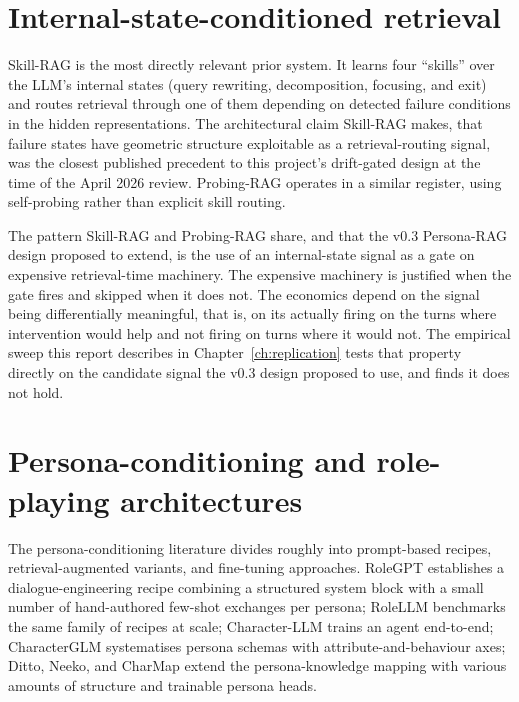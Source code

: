 \section{Internal-state-conditioned retrieval}

Skill-RAG is the most directly relevant prior system\autocite{wei2026skillrag}. It learns four ``skills'' over the LLM's internal states (query rewriting, decomposition, focusing, and exit) and routes retrieval through one of them depending on detected failure conditions in the hidden representations. The architectural claim Skill-RAG makes, that failure states have geometric structure exploitable as a retrieval-routing signal, was the closest published precedent to this project's drift-gated design at the time of the April 2026 review. Probing-RAG operates in a similar register, using self-probing rather than explicit skill routing\autocite{baek2025probingrag}.

The pattern Skill-RAG and Probing-RAG share, and that the v0.3 Persona-RAG design proposed to extend, is the use of an internal-state signal as a gate on expensive retrieval-time machinery. The expensive machinery is justified when the gate fires and skipped when it does not. The economics depend on the signal being differentially meaningful, that is, on its actually firing on the turns where intervention would help and not firing on turns where it would not. The empirical sweep this report describes in Chapter~\ref{ch:replication} tests that property directly on the candidate signal the v0.3 design proposed to use, and finds it does not hold.

\section{Persona-conditioning and role-playing architectures}

The persona-conditioning literature divides roughly into prompt-based recipes, retrieval-augmented variants, and fine-tuning approaches. RoleGPT establishes a dialogue-engineering recipe combining a structured system block with a small number of hand-authored few-shot exchanges per persona\autocite{rolegpt2023}; RoleLLM benchmarks the same family of recipes at scale\autocite{rolellm2023}; Character-LLM trains an agent end-to-end\autocite{characterllm2023}; CharacterGLM systematises persona schemas with attribute-and-behaviour axes\autocite{characterglm2023}; Ditto, Neeko, and CharMap extend the persona-knowledge mapping with various amounts of structure and trainable persona heads\autocite{ditto2024, neeko2024, charmap2024}.

